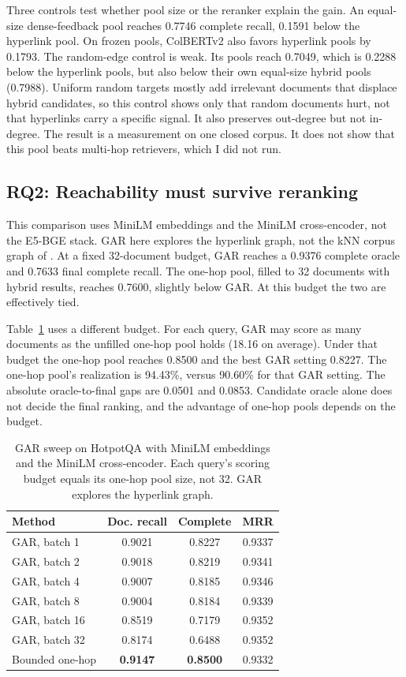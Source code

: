 \documentclass[10pt,twocolumn]{article}
\begin{document}
Three controls test whether pool size or the reranker explain the gain. An
equal-size dense-feedback pool reaches 0.7746 complete recall, 0.1591 below the
hyperlink pool. On frozen pools, ColBERTv2 also favors hyperlink pools by
0.1793. The random-edge control is weak. Its pools reach 0.7049, which is
0.2288 below the hyperlink pools, but also below their own equal-size hybrid
pools (0.7988). Uniform random targets mostly add irrelevant documents that
displace hybrid candidates, so this control shows only that random documents
hurt, not that hyperlinks carry a specific signal. It also preserves
out-degree but not in-degree. The result is a measurement on one closed corpus.
It does not show that this pool beats multi-hop retrievers, which I did not
run.

\subsection{RQ2: Reachability must survive reranking}
\label{sec:reach}

This comparison uses MiniLM embeddings and the MiniLM cross-encoder, not the
E5-BGE stack. GAR here explores the hyperlink graph, not the kNN corpus graph
of \citet{macavaney2022gar}. At a fixed 32-document budget, GAR reaches a
0.9376 complete oracle and 0.7633 final complete recall. The one-hop pool,
filled to 32 documents with hybrid results, reaches 0.7600, slightly below
GAR. At this budget the two are effectively tied.

Table~\ref{tab:gar} uses a different budget. For each query, GAR may score as
many documents as the unfilled one-hop pool holds (18.16 on average). Under
that budget the one-hop pool reaches 0.8500 and the best GAR setting 0.8227.
The one-hop pool's realization is 94.43\%, versus 90.60\% for that GAR
setting. The absolute oracle-to-final gaps are 0.0501 and 0.0853. Candidate
oracle alone does not decide the final ranking, and the advantage of one-hop
pools depends on the budget.

\begin{table}[t]
  \centering
  \caption{GAR sweep on HotpotQA with MiniLM embeddings and the MiniLM
  cross-encoder. Each query's scoring budget equals its one-hop pool size, not
  32. GAR explores the hyperlink graph.}
  \label{tab:gar}
  \small
  \begin{tabular}{lccc}
    \toprule
    Method & Doc. recall & Complete & MRR \\
    \midrule
    GAR, batch 1  & 0.9021 & 0.8227 & 0.9337 \\
    GAR, batch 2  & 0.9018 & 0.8219 & 0.9341 \\
    GAR, batch 4  & 0.9007 & 0.8185 & 0.9346 \\
    GAR, batch 8  & 0.9004 & 0.8184 & 0.9339 \\
    GAR, batch 16 & 0.8519 & 0.7179 & 0.9352 \\
    GAR, batch 32 & 0.8174 & 0.6488 & 0.9352 \\
    Bounded one-hop & \textbf{0.9147} & \textbf{0.8500} & 0.9332 \\
    \bottomrule
  \end{tabular}
\end{table}
\end{document}
